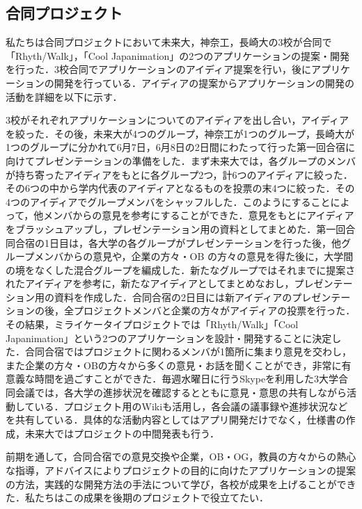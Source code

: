 \subsection{合同プロジェクト}

\par 私たちは合同プロジェクトにおいて未来大，神奈工，長崎大の3校が合同で「Rhyth/Walk」，「Cool Japanimation」の2つのアプリケーションの提案・開発を行った．3校合同でアプリケーションのアイディア提案を行い，後にアプリケーションの開発を行っている．アイディアの提案からアプリケーションの開発の活動を詳細を以下に示す．
\par 3校がそれぞれアプリケーションについてのアイディアを出し合い，アイディアを絞った．その後，未来大が4つのグループ，神奈工が1つのグループ，長崎大が1つのグループに分かれて6月7日，6月8日の2日間にわたって行った第一回合宿に向けてプレゼンテーションの準備をした．まず未来大では，各グループのメンバが持ち寄ったアイディアをもとに各グループ2つ，計6つのアイディアに絞った．その6つの中から学内代表のアイディアとなるものを投票の末4つに絞った．その4つのアイディアでグループメンバをシャッフルした．このようにすることによって，他メンバからの意見を参考にすることができた．意見をもとにアイディアをブラッシュアップし，プレゼンテーション用の資料としてまとめた．第一回合同合宿の1日目は，各大学の各グループがプレゼンテーションを行った後，他グループメンバからの意見や，企業の方々・OB の方々の意見を得た後に，大学間の境をなくした混合グループを編成した．新たなグループではそれまでに提案されたアイディアを参考に，新たなアイディアとしてまとめなおし，プレゼンテーション用の資料を作成した．合同合宿の2日目には新アイディアのプレゼンテーションの後，全プロジェクトメンバと企業の方々がアイディアの投票を行った．その結果，ミライケータイプロジェクトでは「Rhyth/Walk」「Cool Japanimation」という2つのアプリケーションを設計・開発することに決定した．合同合宿ではプロジェクトに関わるメンバが1箇所に集まり意見を交わし，また企業の方々・OBの方々から多くの意見・お話を聞くことができ，非常に有意義な時間を過ごすことができた．毎週水曜日に行うSkypeを利用した3大学合同会議では，各大学の進捗状況を確認するとともに意見・意思の共有しながら活動している．プロジェクト用のWikiも活用し，各会議の議事録や進捗状況などを共有している．具体的な活動内容としてはアプリ開発だけでなく，仕様書の作成，未来大ではプロジェクトの中間発表も行う．
\par 前期を通して，合同合宿での意見交換や企業，OB・OG，教員の方々からの熱心な指導，アドバイスによりプロジェクトの目的に向けたアプリケーションの提案の方法，実践的な開発方法の手法について学び，各校が成果を上げることができた．私たちはこの成果を後期のプロジェクトで役立てたい．

